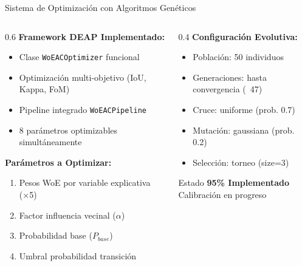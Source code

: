 \documentclass[aspectratio=169]{beamer}
\begin{document}
\begin{frame}{Sistema de Optimización con Algoritmos Genéticos}
  \begin{columns}
    \begin{column}{0.6\textwidth}
      \textbf{Framework DEAP Implementado:}
      \begin{itemize}
        \item Clase \texttt{WoEACOptimizer} funcional
        \item Optimización multi-objetivo (IoU, Kappa, FoM)
        \item Pipeline integrado \texttt{WoEACPipeline}
        \item 8 parámetros optimizables simultáneamente
      \end{itemize}
      
      \vspace{0.3cm}
      \textbf{Parámetros a Optimizar:}
      \begin{enumerate}
        \item Pesos WoE por variable explicativa (×5)
        \item Factor influencia vecinal ($\alpha$)  
        \item Probabilidad base ($P_{base}$)
        \item Umbral probabilidad transición
      \end{enumerate}
    \end{column}
    \begin{column}{0.4\textwidth}
      \textbf{Configuración Evolutiva:}
      \begin{itemize}
        \item Población: 50 individuos
        \item Generaciones: hasta convergencia (~47)
        \item Cruce: uniforme (prob. 0.7)
        \item Mutación: gaussiana (prob. 0.2)
        \item Selección: torneo (size=3)
      \end{itemize}
      
      \vspace{0.3cm}
      \begin{alertblock}{Estado}
      \textcolor{UNAMBlue}{\textbf{95\% Implementado}} \\
      Calibración en progreso
      \end{alertblock}
    \end{column}
  \end{columns}
\end{frame}
\end{document}
